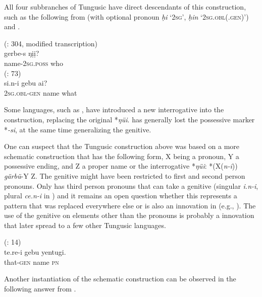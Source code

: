 \documentclass[output=paper,colorlinks,citecolor=brown]{langscibook}
\begin{document}
\begin{sloppypar}
\noindent All four subbranches of Tungusic have direct descendants of this construction, such as the following from  (with optional pronoun \textit{ḥi} `2\textsc{sg}', \textit{ḥin} `2\textsc{sg.obl(.gen)}') and .
\end{sloppypar}

\ea
    \label{example4.127}
     (\citealt{Doerferetal1980}: 304, modified transcription)\\
    \gll 		gerbe-s			ŋịị?\\
    name-2\textsc{sg.poss}		who\\
\ex
    \label{example4.128}
     (\citealt{Haenisch1961}: 73)\\
    \gll si.n-i			gebu			ai?\\
    2\textsc{sg.obl-gen}		name			what\\
\z

\noindent Some languages, such as , have introduced a new interrogative into the construction, replacing the original *\textit{ŋüi}.  has generally lost the possessive marker *\textit{-si}, at the same time generalizing the genitive.

One can suspect that the Tungusic construction above was based on a more schematic construction that has the following form, X being a pronoun, Y a possessive ending, and Z a proper name or the interrogative *\textit{ŋüi}: *(X(\textit{n-i})) \textit{gärbü}-Y Z. The genitive might have been restricted to first and second person pronouns. Only  has third person pronouns that can take a genitive (singular \textit{i.n-i}, plural \textit{ce.n-i} in ) and it remains an open question whether this represents a  pattern that was replaced everywhere else or is also an innovation in  (e.g., ). The use of the genitive on elements other than the pronouns is probably a  innovation that later spread to a few other Tungusic languages.

\ea
    \label{example4.129}
     (\citealt{AixinjueluoYingsheng1987a}: 14)\\
    \gll te.re-i			gebu			yentugi.\\
    that-\textsc{gen}			name			\textsc{pn}\\
    \z

\noindent Another instantiation of the schematic construction can be observed in the following answer from .
\end{document}
